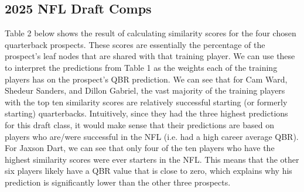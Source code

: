 \documentclass{article}
\begin{document}


\subsection{2025 NFL Draft Comps}

Table 2 below shows the result of calculating similarity scores for the four chosen quarterback prospects. These scores are essentially the percentage of the prospect's leaf nodes that are shared with that training player. We can use these to interpret the predictions from Table 1 as the weights each of the training players has on the prospect's QBR prediction. We can see that for Cam Ward, Shedeur Sanders, and Dillon Gabriel, the vast majority of the training players with the top ten similarity scores are relatively successful starting (or formerly starting) quarterbacks. Intuitively, since they had the three highest predictions for this draft class, it would make sense that their predictions are based on players who are/were successful in the NFL (i.e. had a high career average QBR). For Jaxson Dart, we can see that only four of the ten players who have the highest similarity scores were ever starters in the NFL. This means that the other six players likely have a QBR value that is close to zero, which explains why his prediction is significantly lower than the other three prospects.
\end{document}
